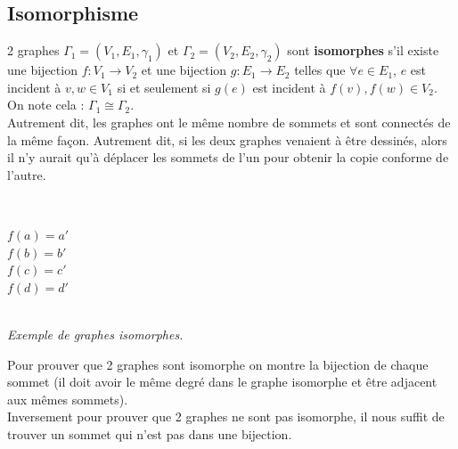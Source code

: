 \documentclass[11pt]{article}
\begin{document}
	\subsection{Isomorphisme}
		2 graphes $\Gamma_1 = (V_1,E_1,\gamma_1)$ et $\Gamma_2 = (V_2,E_2,\gamma_2)$ sont \textbf{isomorphes} s'il existe une bijection $f : V_1 \rightarrow V_2$ et une bijection $g : E_1 \rightarrow E_2$ telles que $\forall e \in E_1$, $e$ est incident à $v, w \in V_1$ si et seulement si $g(e)$ est incident à $f(v), f(w) \in V_2$. On note cela : $\Gamma_1 \cong \Gamma_2$. \\ %
		Autrement dit, les graphes ont le même nombre de sommets et sont connectés de la même façon. Autrement dit, si les deux graphes venaient à être dessinés, alors il n'y aurait qu'à déplacer les sommets de l'un pour obtenir la copie conforme de l'autre.\\
		\begin{center}
		\begin{minipage}{0.5\textwidth}
			 \\
			\end{minipage}\hfill
			\begin{minipage}{0.5\textwidth}
			\center
			$f(a) = a'$ \\
			$f(b) = b'$ \\
			$f(c) = c'$ \\
			$f(d) = d'$ 
			\end{minipage}\\
			\textit{Exemple de graphes isomorphes.}
		\end{center}
		
		Pour prouver que 2 graphes sont isomorphe on montre la bijection de chaque sommet (il doit avoir le même degré dans le graphe isomorphe et être adjacent aux mêmes sommets).\\
		Inversement pour prouver que 2 graphes ne sont pas isomorphe, il nous suffit de trouver un sommet qui n'est pas dans une bijection.
	
\end{document}
